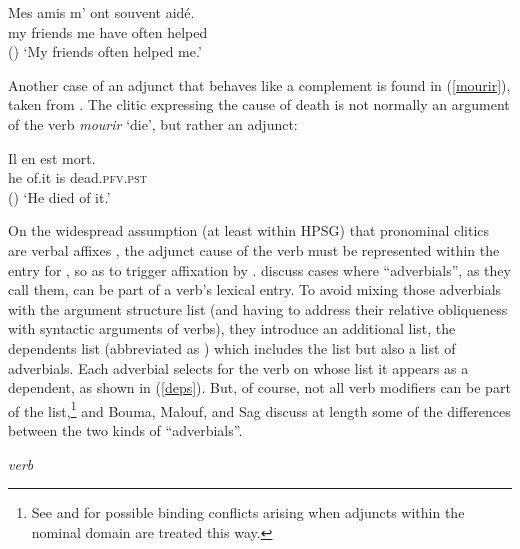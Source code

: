 \documentclass[output=paper,biblatex,babelshorthands,newtxmath,draftmode,colorlinks, citecolor=brown]{langscibook}
\begin{document}
\begin{exe}
\ex\label{adj}
 \gll
	Mes amis m’ ont souvent aidé. \\
	my friends me have often helped \\\hfill()
	\glt `My friends often helped me.'
\end{exe}


Another case of an adjunct that behaves like a complement is found in (\ref{mourir}), taken from \citep[81]{KoenigandDavis2006}.  The clitic  expressing the cause of death   is not normally an argument of the verb \textit{mourir} `die', but rather an adjunct: %

\ea
\label{mourir}
\gll Il en est mort. \\
     he of.it is dead.\textsc{pfv.pst} \\\hfill()
\glt `He died of it.'
\z

\noindent
On the widespread assumption (at least within HPSG) that pronominal clitics are verbal affixes \citep{MillerandSag1997}, the adjunct cause of the verb  must be represented within the entry for , so as to trigger affixation by . \citet{Boumaetal2001} discuss cases where ``adverbials'', as they call them, can be part of a verb's lexical entry. To avoid mixing those adverbials with the argument structure list (and having to address their relative obliqueness with syntactic arguments of verbs), they introduce  an additional list, the dependents list (abbreviated as \deps) which includes the \argst list but also a list of adverbials. Each adverbial selects for the verb on whose \deps list it appears as a dependent, as shown in (\ref{deps}). But, of course, not all verb modifiers can be part of the \deps list,\footnote{%
See  and  for possible binding conflicts arising when adjuncts within the nominal domain are treated this way.
} and Bouma, Malouf, and Sag discuss at length some of the differences between the two kinds of ``adverbials''.

\begin{exe}
\ex\label{deps}
\emph{verb} \impl
{}
\end{exe}
\end{document}
